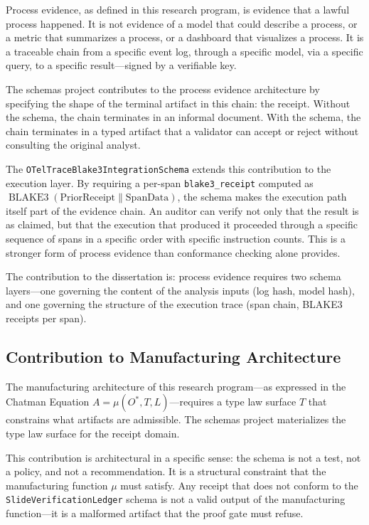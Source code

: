Process evidence, as defined in this research program, is evidence that a lawful process happened.
It is not evidence of a model that could describe a process, or a metric that summarizes a process,
or a dashboard that visualizes a process. It is a traceable chain from a specific event log,
through a specific model, via a specific query, to a specific result---signed by a verifiable key.

The schemas project contributes to the process evidence architecture by specifying the shape of
the terminal artifact in this chain: the receipt. Without the schema, the chain terminates in an
informal document. With the schema, the chain terminates in a typed artifact that a validator can
accept or reject without consulting the original analyst.

The \texttt{OTelTraceBlake3IntegrationSchema} extends this contribution to the execution layer.
By requiring a per-span \texttt{blake3\_receipt} computed as
$\operatorname{BLAKE3}(\text{PriorReceipt} \| \text{SpanData})$, the schema makes the execution
path itself part of the evidence chain. An auditor can verify not only that the result is as
claimed, but that the execution that produced it proceeded through a specific sequence of spans
in a specific order with specific instruction counts. This is a stronger form of process evidence
than conformance checking alone provides.

The contribution to the dissertation is: process evidence requires two schema layers---one
governing the content of the analysis inputs (log hash, model hash), and one governing the
structure of the execution trace (span chain, BLAKE3 receipts per span).

\subsection{Contribution to Manufacturing Architecture}
\label{sec:schemas-contribution-manufacturing}

The manufacturing architecture of this research program---as expressed in the Chatman Equation
$A = \mu(O^*, T, L)$---requires a type law surface $T$ that constrains what artifacts are
admissible. The schemas project materializes the type law surface for the receipt domain.

This contribution is architectural in a specific sense: the schema is not a test, not a policy,
and not a recommendation. It is a structural constraint that the manufacturing function $\mu$ must
satisfy. Any receipt that does not conform to the \texttt{SlideVerificationLedger} schema is not
a valid output of the manufacturing function---it is a malformed artifact that the proof gate must
refuse.

